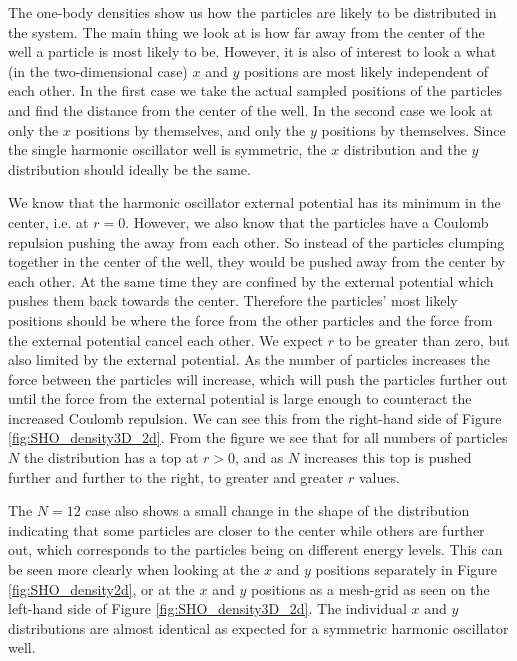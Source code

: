 \documentclass[../main.tex]{subfiles}
\begin{document}
The one-body densities show us how the particles are likely to be distributed in the system. The main thing we look at is how far away from the center of the well a particle is most likely to be. However, it is also of interest to look a what (in the two-dimensional case) $x$ and $y$ positions are most likely independent of each other. In the first case we take the actual sampled positions of the particles and find the distance from the center of the well. In the second case we look at only the $x$ positions by themselves, and only the $y$ positions by themselves. Since the single harmonic oscillator well is symmetric, the $x$ distribution and the $y$ distribution should ideally be the same. 

We know that the harmonic oscillator external potential has its minimum in the center, i.e. at $r=0$. However, we also know that the particles have a Coulomb repulsion pushing the away from each other. So instead of the particles clumping together in the center of the well, they would be pushed away from the center by each other. At the same time they are confined by the external potential which pushes them back towards the center. Therefore the particles' most likely positions should be where the force from the other particles and the force from the external potential cancel each other. We expect $r$ to be greater than zero, but also limited by the external potential. As the number of particles increases the force between the particles will increase, which will push the particles further out until the force from the external potential is large enough to counteract the increased Coulomb repulsion. We can see this from the right-hand side of Figure \ref{fig:SHO_density3D_2d}. From the figure we see that for all numbers of particles $N$ the distribution has a top at $r>0$, and as $N$ increases this top is pushed further and further to the right, to greater and greater $r$ values. 

The $N=12$ case also shows a small change in the shape of the distribution indicating that some particles are closer to the center while others are further out, which corresponds to the particles being on different energy levels. This can be seen more clearly when looking at the $x$ and $y$ positions separately in Figure \ref{fig:SHO_density2d}, or at the $x$ and $y$ positions as a mesh-grid as seen on the left-hand side of Figure \ref{fig:SHO_density3D_2d}. The individual $x$ and $y$ distributions are almost identical as expected for a symmetric harmonic oscillator well.
\end{document}
